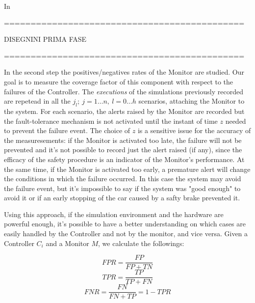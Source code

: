 In



=============================================

DISEGNINI PRIMA FASE

=============================================

In the second step the positives/negatives rates of the Monitor are studied. Our goal is to measure the coverage factor of this component with respect to the failures of the Controller.\newline
The \textsl{executions} of the simulations previously recorded are repetead in all the $j_{l}; \: j=1\dots n, \: l=0\dots h$ scenarios, attaching the Monitor to the system. For each scenario, the alerts raised by the Monitor are recorded but the fault-tolerance mechanism is not activated until the instant of time $z$ needed to prevent the failure event. The choice of $z$ is a sensitive issue for the accuracy of the measuresements: if the Monitor is activated too late, the failure will not be prevented and it's not possible to record just the alert raised (if any), since the efficacy of the safety procedure is an indicator of the Monitor's performance. At the same time, if the Monitor is activated too early, a premature alert will change the conditions in which the failure occurred. In this case the system may avoid the failure event, but it's impossible to say if the system was "good enough" to avoid it or if an early stopping of the car caused by a safty brake prevented it.

Using this approach, if the simulation environment and the hardware are powerful enough, it's possible to have a better understanding on which cases are easily handled by the Controller and not by the monitor, and vice versa.
Given a Controller $C_{i}$ and a Monitor $M$, we calculate the followings:

\begin{equation}
	FPR = \frac{FP}{FP+TN}
\end{equation}
\begin{equation}
	TPR = \frac{TP}{TP+FN}
\end{equation}
\begin{equation}
	FNR = \frac{FN}{FN+TP} = 1 - TPR
\end{equation}

